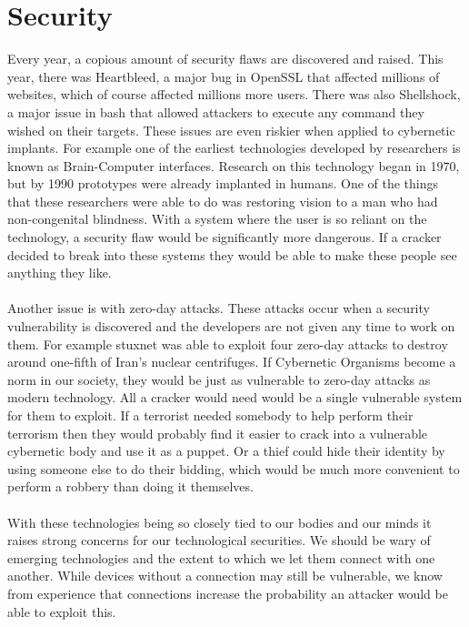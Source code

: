 \documentclass[12pt,a4paper,notitlepage]{article}
\begin{document}
\section{Security}
Every year, a copious amount of security flaws are discovered and raised. This
year, there was Heartbleed\cite{Heartbleed}, a major bug in OpenSSL that
affected millions of websites, which of course affected millions more users.
There was also Shellshock\cite{Shellshock}, a major issue in bash that allowed
attackers to execute any command they wished on their targets. These issues are
even riskier when applied to cybernetic implants. For example one of the
earliest technologies developed by researchers is known as Brain-Computer
interfaces. Research on this technology began in 1970, but by 1990 prototypes
were already implanted in humans. One of the things that these researchers were
able to do was restoring vision to a man who had non-congenital
blindness\cite{sight}. With a system where the user is so reliant on the
technology, a security flaw would be significantly more dangerous. If a cracker
decided to break into these systems they would be able to make these people see
anything they like.
\\\\
Another issue is with zero-day attacks. These attacks occur when a security
vulnerability is discovered and the developers are not given any time to work on
them. For example stuxnet\cite{0day} was able to exploit four zero-day attacks
to destroy around one-fifth of Iran's nuclear centrifuges.  If Cybernetic
Organisms become a norm in our society, they would be just as vulnerable to
zero-day attacks as modern technology. All a cracker would need would be a
single vulnerable system for them to exploit.  If a terrorist needed somebody to
help perform their terrorism then they would probably find it easier to crack
into a vulnerable cybernetic body and use it as a puppet. Or a thief could hide
their identity by using someone else to do their bidding, which would be much
more convenient to perform a robbery than doing it themselves.
\\\\
With these technologies being so closely tied to our bodies and our minds it
raises strong concerns for our technological securities.  We should be wary of
emerging technologies and the extent to which  we let them connect with one
another. While devices without a connection may still be vulnerable, we know
from experience that connections increase the probability an attacker would be
able to exploit this.
\end{document}
